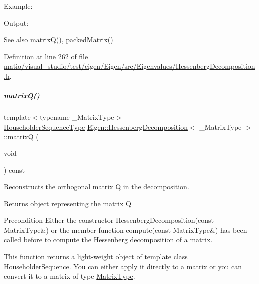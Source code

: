 Example\+: 
\begin{DoxyCodeInclude}
\end{DoxyCodeInclude}
 Output\+: 
\begin{DoxyVerbInclude}
\end{DoxyVerbInclude}


\begin{DoxySeeAlso}{See also}
\hyperlink{group___eigenvalues___module_a346441e4902a58d43d698ac3da6ff791}{matrix\+Q()}, \hyperlink{group___eigenvalues___module_a1f72b7612fd4edc5a6f31005e433e1dd}{packed\+Matrix()} 
\end{DoxySeeAlso}


Definition at line \hyperlink{matio_2visual__studio_2test_2eigen_2_eigen_2src_2_eigenvalues_2_hessenberg_decomposition_8h_source_l00262}{262} of file \hyperlink{matio_2visual__studio_2test_2eigen_2_eigen_2src_2_eigenvalues_2_hessenberg_decomposition_8h_source}{matio/visual\+\_\+studio/test/eigen/\+Eigen/src/\+Eigenvalues/\+Hessenberg\+Decomposition.\+h}.

\mbox{\label{group___eigenvalues___module_a346441e4902a58d43d698ac3da6ff791}} 
\subparagraph{\texorpdfstring{matrix\+Q()}{matrixQ()}\hspace{0.1cm}{\footnotesize\ttfamily [1/2]}}
{\footnotesize\ttfamily template$<$typename \+\_\+\+Matrix\+Type$>$ \\
\hyperlink{group___eigenvalues___module_a7c1188cd5d8f550c8941df75a50a7d08}{Householder\+Sequence\+Type} \hyperlink{group___eigenvalues___module_class_eigen_1_1_hessenberg_decomposition}{Eigen\+::\+Hessenberg\+Decomposition}$<$ \+\_\+\+Matrix\+Type $>$\+::matrixQ (\begin{DoxyParamCaption}\item[{void}]{ }\end{DoxyParamCaption}) const\hspace{0.3cm}{\ttfamily [inline]}}



Reconstructs the orthogonal matrix Q in the decomposition. 

\begin{DoxyReturn}{Returns}
object representing the matrix Q
\end{DoxyReturn}
\begin{DoxyPrecond}{Precondition}
Either the constructor Hessenberg\+Decomposition(const Matrix\+Type\&) or the member function compute(const Matrix\+Type\&) has been called before to compute the Hessenberg decomposition of a matrix.
\end{DoxyPrecond}
This function returns a light-\/weight object of template class \hyperlink{group___householder___module_class_eigen_1_1_householder_sequence}{Householder\+Sequence}. You can either apply it directly to a matrix or you can convert it to a matrix of type \hyperlink{group___eigenvalues___module_a93a611350a7db9d1da18f2c828ecea9f}{Matrix\+Type}.

